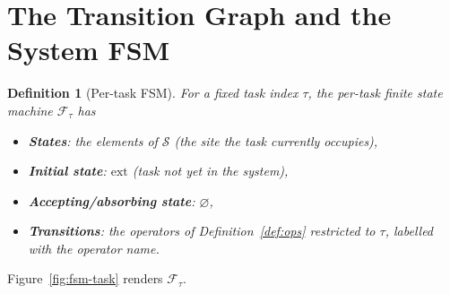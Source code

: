 \documentclass[11pt,a4paper]{article}
\newtheorem{definition}{Definition}[section]
\begin{document}
\section{The Transition Graph and the System FSM}

\begin{definition}[Per-task FSM]
\label{def:fsm-task}
For a fixed task index $\tau$, the \emph{per-task finite state
machine} $\mathcal{F}_\tau$ has
\begin{itemize}
  \item \textbf{States}: the elements of $\mathcal{S}$ (the site the task currently occupies),
  \item \textbf{Initial state}: $\text{ext}$ (task not yet in the system),
  \item \textbf{Accepting/absorbing state}: $\varnothing$,
  \item \textbf{Transitions}: the operators of Definition~\ref{def:ops}
        restricted to $\tau$, labelled with the operator name.
\end{itemize}
\end{definition}

Figure~\ref{fig:fsm-task} renders $\mathcal{F}_\tau$.
\end{document}
